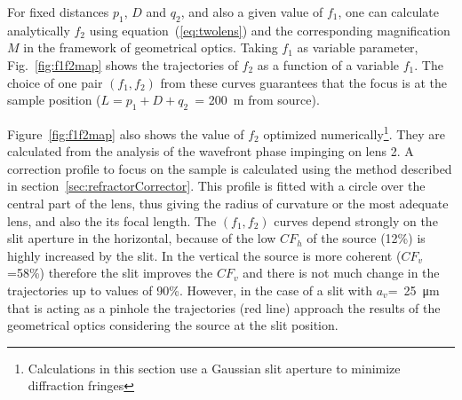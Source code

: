 \documentclass{iucr}              %
\begin{document}
For fixed distances $p_1$, $D$ and $q_2$, and also a given value of $f_1$, one can calculate analytically $f_2$ using  equation~(\ref{eq:twolens}) and the corresponding magnification $M$ in the framework of geometrical optics. Taking $f_1$ as variable parameter,  
Fig.~\ref{fig:f1f2map} shows the trajectories of $f_2$ as a function of a variable $f_1$. 
The choice of one pair $(f_1,f_2)$ from these curves guarantees that the focus is at the sample position ($L=p_1+D+q_2$~= \SI{200}{\meter} from source).

Figure~\ref{fig:f1f2map} also shows the value of $f_2$ optimized numerically\footnote{Calculations in this section use a Gaussian slit aperture to minimize diffraction fringes}. They are calculated from the analysis of the wavefront phase impinging on lens 2. A correction profile to focus on the sample is calculated using the method described in section~\ref{sec:refractorCorrector}. This profile is fitted with a circle over the central part of the lens, thus giving the radius of curvature or the most adequate lens, and also the its focal length. 
The $(f_1,f_2)$ curves depend strongly on the slit aperture in the horizontal, because of the low $CF_h$ of the source (12\%) is highly increased by the slit. In the vertical the source is more coherent ($CF_v$=58\%) therefore the slit improves the $CF_v$  and there is not much change in the trajectories up to values of 90\%. However, in the case of a slit with $a_v$=~\SI{25}{\micro\meter} that is acting as a pinhole the trajectories (red line) approach the results of the geometrical optics considering the source at the slit position.
\end{document}
